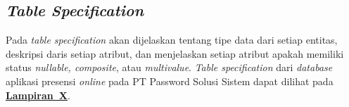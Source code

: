 \subsection{\textit{Table Specification}}
Pada \textit{table specification} akan dijelaskan tentang tipe data dari setiap entitas, deskripsi daris setiap atribut, dan menjelaskan setiap atribut apakah memiliki status \textit{nullable, composite}, atau \textit{multivalue}. \textit{Table specification} dari \textit{database} aplikasi presensi \textit{online} pada PT Password Solusi Sistem dapat dilihat pada \hyperref[sec:table-specification]{\textbf{Lampiran~X}}.

